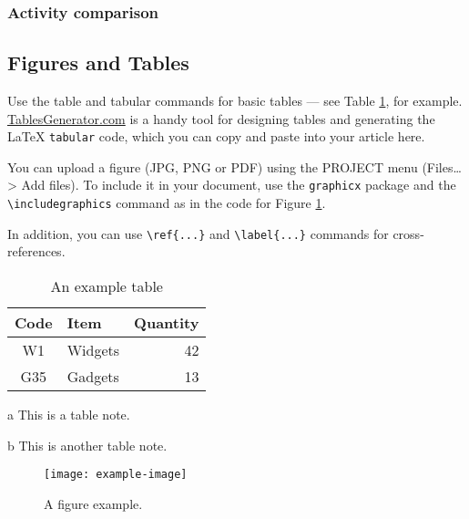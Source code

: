 \documentclass{biophys-new}
\begin{document}
\subsubsection{Activity comparison }

\subsection*{Figures and Tables}

Use the table and tabular commands for basic tables --- see Table \ref{tab:widgets}, for example. \href{http://tablesgenerator.com}{TablesGenerator.com} is a handy tool for designing tables and generating the \LaTeX{} \texttt{tabular} code, which you can copy and paste into your article here.

You can upload a figure (JPG, PNG or PDF) using the PROJECT menu (Files\ldots > Add files). To include it in your document, use the \verb|graphicx| package and the \verb|\includegraphics| command as in the code for Figure \ref{fig:view}. 

In addition, you can use \verb|\ref{...}| and \verb|\label{...}| commands for cross-references.

\begin{table}[hbt!]
\caption{An example table}
\label{tab:widgets}
\centering

\begin{threeparttable}

\begin{tabular}{c l r}
\hline
Code & Item & Quantity \\\hline
W1 & Widgets\tnote{a} & 42 \\
G35 & Gadgets & 13\tnote{b} \\
\hline
\end{tabular}

\begin{tablenotes}
\item[a] This is a table note.
\item[b] This is another table note.
\end{tablenotes}

\end{threeparttable}

\end{table}

\begin{figure}[hbt!]
\centering
\texttt{[image: example-image]}
\caption{A figure example.}
\label{fig:view}

\end{figure}
\end{document}
